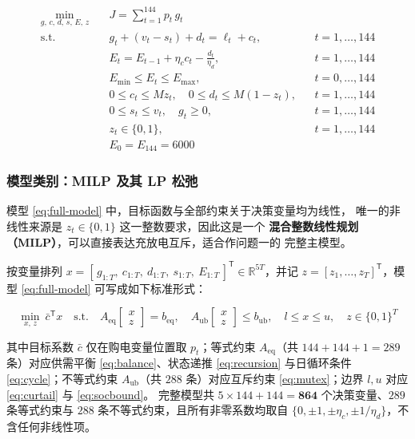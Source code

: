 \documentclass[withoutpreface,bwprint]{cumcmthesis}
\begin{document}
\begin{equation}
\begin{aligned}
  \min_{g,\,c,\,d,\,s,\,E,\,z} \quad & J = \sum_{t=1}^{144} p_t\, g_t \\[2pt]
  \text{s.t.} \quad
  & g_t + (v_t - s_t) + d_t = \ell_t + c_t, && t = 1,\dots,144 \\
  & E_t = E_{t-1} + \eta_c c_t - \frac{d_t}{\eta_d}, && t = 1,\dots,144 \\
  & E_{\min} \le E_t \le E_{\max}, && t = 0,\dots,144 \\
  & 0 \le c_t \le M z_t, \quad 0 \le d_t \le M(1-z_t), && t = 1,\dots,144 \\
  & 0 \le s_t \le v_t, \quad g_t \ge 0, && t = 1,\dots,144 \\
  & z_t \in \{0,1\}, && t = 1,\dots,144 \\
  & E_0 = E_{144} = 6000
\end{aligned}
\label{eq:full-model}
\end{equation}

\subsubsection{模型类别：MILP 及其 LP 松弛}

模型 \eqref{eq:full-model} 中，目标函数与全部约束关于决策变量均为线性，
唯一的非线性来源是 $z_t \in \{0,1\}$ 这一整数要求，因此这是一个
\textbf{混合整数线性规划（MILP）}，可以直接表达充放电互斥，适合作问题一的
完整主模型。

按变量排列
$x = [\,g_{1:T},\ c_{1:T},\ d_{1:T},\ s_{1:T},\ E_{1:T}\,]^{\mathsf{T}}
\in \mathbb{R}^{5T}$，并记 $z = [z_1,\dots,z_T]^{\mathsf{T}}$，模型
\eqref{eq:full-model} 可写成如下标准形式：

\begin{equation}
  \min_{x,\,z}\ \bar{c}^{\mathsf{T}} x
  \quad \text{s.t.} \quad
  A_{\mathrm{eq}}\begin{bmatrix}x\\z\end{bmatrix} = b_{\mathrm{eq}}, \quad
  A_{\mathrm{ub}}\begin{bmatrix}x\\z\end{bmatrix} \le b_{\mathrm{ub}}, \quad
  l \le x \le u, \quad z \in \{0,1\}^{T}
  \label{eq:milp-standard}
\end{equation}

其中目标系数 $\bar{c}$ 仅在购电变量位置取 $p_t$；等式约束
$A_{\mathrm{eq}}$（共 $144+144+1 = 289$ 条）对应供需平衡
\eqref{eq:balance}、状态递推 \eqref{eq:recursion} 与日循环条件
\eqref{eq:cycle}；不等式约束 $A_{\mathrm{ub}}$（共 $288$ 条）对应互斥约束
\eqref{eq:mutex}；边界 $l,u$ 对应 \eqref{eq:curtail} 与 \eqref{eq:socbound}。
完整模型共 $5\times144 + 144 = \mathbf{864}$ 个决策变量、$289$ 条等式约束与
$288$ 条不等式约束，且所有非零系数均取自
$\{0, \pm1, \pm\eta_c, \pm 1/\eta_d\}$，不含任何非线性项。
\end{document}
